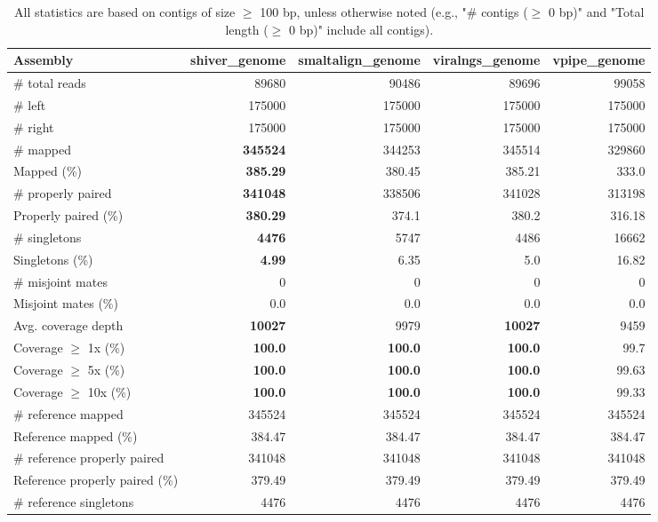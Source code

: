 \documentclass[12pt,a4paper]{article}
\begin{document}
\begin{table}[ht]
\begin{center}
\caption{All statistics are based on contigs of size $\geq$ 100 bp, unless otherwise noted (e.g., "\# contigs ($\geq$ 0 bp)" and "Total length ($\geq$ 0 bp)" include all contigs).}
\begin{tabular}{|l*{4}{|r}|}
\hline
Assembly & shiver\_genome & smaltalign\_genome & viralngs\_genome & vpipe\_genome \\ \hline
\# total reads & 89680 & 90486 & 89696 & 99058 \\ \hline
\# left & 175000 & 175000 & 175000 & 175000 \\ \hline
\# right & 175000 & 175000 & 175000 & 175000 \\ \hline
\# mapped & {\bf 345524} & 344253 & 345514 & 329860 \\ \hline
Mapped (\%) & {\bf 385.29} & 380.45 & 385.21 & 333.0 \\ \hline
\# properly paired & {\bf 341048} & 338506 & 341028 & 313198 \\ \hline
Properly paired (\%) & {\bf 380.29} & 374.1 & 380.2 & 316.18 \\ \hline
\# singletons & {\bf 4476} & 5747 & 4486 & 16662 \\ \hline
Singletons (\%) & {\bf 4.99} & 6.35 & 5.0 & 16.82 \\ \hline
\# misjoint mates & 0 & 0 & 0 & 0 \\ \hline
Misjoint mates (\%) & 0.0 & 0.0 & 0.0 & 0.0 \\ \hline
Avg. coverage depth & {\bf 10027} & 9979 & {\bf 10027} & 9459 \\ \hline
Coverage $\geq$ 1x (\%) & {\bf 100.0} & {\bf 100.0} & {\bf 100.0} & 99.7 \\ \hline
Coverage $\geq$ 5x (\%) & {\bf 100.0} & {\bf 100.0} & {\bf 100.0} & 99.63 \\ \hline
Coverage $\geq$ 10x (\%) & {\bf 100.0} & {\bf 100.0} & {\bf 100.0} & 99.33 \\ \hline
\# reference mapped & 345524 & 345524 & 345524 & 345524 \\ \hline
Reference mapped (\%) & 384.47 & 384.47 & 384.47 & 384.47 \\ \hline
\# reference properly paired & 341048 & 341048 & 341048 & 341048 \\ \hline
Reference properly paired (\%) & 379.49 & 379.49 & 379.49 & 379.49 \\ \hline
\# reference singletons & 4476 & 4476 & 4476 & 4476 \\ \hline

\end{tabular}
\end{center}
\end{table}
\end{document}
